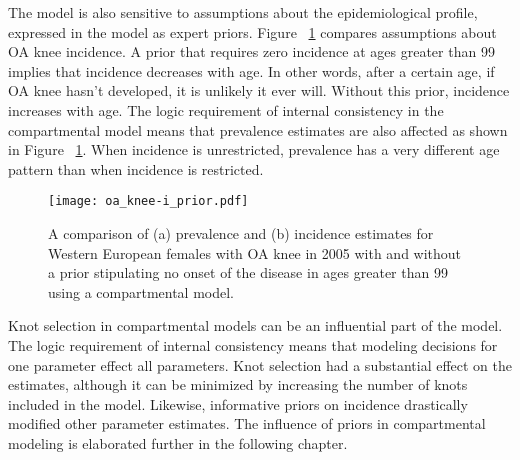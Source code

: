 The model is also sensitive to assumptions about the epidemiological
profile, expressed in the model as expert priors.  Figure
~\ref{fig:app-oa knee priors} compares assumptions about OA knee
incidence.  A prior that requires zero incidence at ages greater than
99 implies that incidence decreases with age.  In other words, after a
certain age, if OA knee hasn't developed, it is unlikely it ever
will. Without this prior, incidence increases with age.  The logic
requirement of internal consistency in the compartmental model means
that prevalence estimates are also affected as shown in Figure
~\ref{fig:app-oa knee priors}.  When incidence is unrestricted,
prevalence has a very different age pattern than when incidence is
restricted.

    \begin{figure}[h]
        \begin{center}
            \texttt{[image: oa\_knee-i\_prior.pdf]}
            \caption{A comparison of (a) prevalence and (b) incidence estimates
              for Western European females
              with OA knee in 2005 with and
              without a prior stipulating no onset of the disease in
              ages greater than 99 using a compartmental model.}
            \label{fig:app-oa knee priors}
        \end{center}
    \end{figure}

Knot selection in compartmental models can be an influential part of
the model.  The logic requirement of internal consistency means that
modeling decisions for one parameter effect all parameters.  Knot
selection had a substantial effect on the estimates, although it can
be minimized by increasing the number of knots included in the model.
Likewise, informative priors on incidence drastically modified other
parameter estimates.  The influence of priors in compartmental
modeling is elaborated further in the following chapter.

